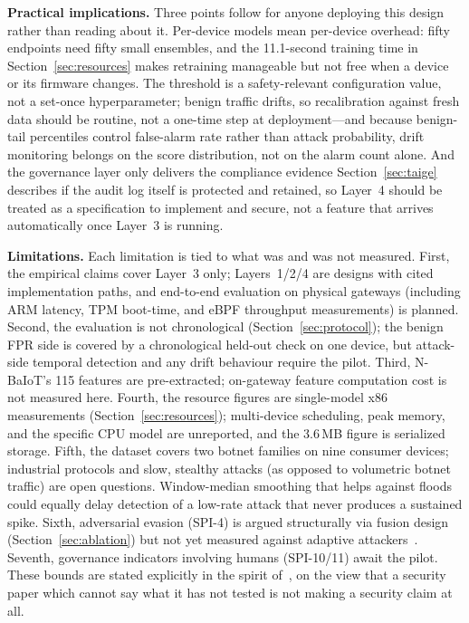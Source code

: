 \documentclass[sigconf,review,anonymous]{acmart}
\begin{document}
\textbf{Practical implications.} Three points follow for anyone deploying this design rather than reading about it. Per-device models mean per-device overhead: fifty endpoints need fifty small ensembles, and the 11.1-second training time in Section~\ref{sec:resources} makes retraining manageable but not free when a device or its firmware changes. The threshold is a safety-relevant configuration value, not a set-once hyperparameter; benign traffic drifts, so recalibration against fresh data should be routine, not a one-time step at deployment---and because benign-tail percentiles control false-alarm rate rather than attack probability, drift monitoring belongs on the score distribution, not on the alarm count alone. And the governance layer only delivers the compliance evidence Section~\ref{sec:taige} describes if the audit log itself is protected and retained, so Layer~4 should be treated as a specification to implement and secure, not a feature that arrives automatically once Layer~3 is running.

\textbf{Limitations.} Each limitation is tied to what was and was not measured. First, the empirical claims cover Layer~3 only; Layers~1/2/4 are designs with cited implementation paths, and end-to-end evaluation on physical gateways (including ARM latency, TPM boot-time, and eBPF throughput measurements) is planned. Second, the evaluation is not chronological (Section~\ref{sec:protocol}); the benign FPR side is covered by a chronological held-out check on one device, but attack-side temporal detection and any drift behaviour require the pilot. Third, N-BaIoT's 115 features are pre-extracted; on-gateway feature computation cost is not measured here. Fourth, the resource figures are single-model x86 measurements (Section~\ref{sec:resources}); multi-device scheduling, peak memory, and the specific CPU model are unreported, and the 3.6\,MB figure is serialized storage. Fifth, the dataset covers two botnet families on nine consumer devices; industrial protocols and slow, stealthy attacks (as opposed to volumetric botnet traffic) are open questions. Window-median smoothing that helps against floods could equally delay detection of a low-rate attack that never produces a sustained spike. Sixth, adversarial evasion (SPI-4) is argued structurally via fusion design (Section~\ref{sec:ablation}) but not yet measured against adaptive attackers~\cite{alhajjar2021}. Seventh, governance indicators involving humans (SPI-10/11) await the pilot. These bounds are stated explicitly in the spirit of~\cite{arp2022dodo}, on the view that a security paper which cannot say what it has not tested is not making a security claim at all.
\end{document}

